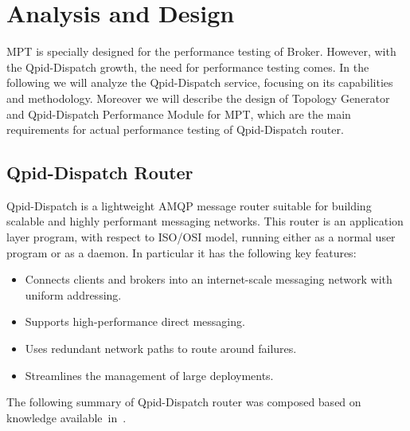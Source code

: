 
\chapter{Analysis and Design}
\label{Analysis and Design}
MPT is specially designed for the performance testing of Broker. However, with the Qpid-Dispatch growth, the need for performance testing comes. In the following we will analyze the Qpid-Dispatch service, focusing on its capabilities and methodology. Moreover we will describe the design of Topology Generator and Qpid-Dispatch Performance Module for MPT, which are the main requirements for actual performance testing of Qpid-Dispatch router.

\section{Qpid-Dispatch Router}
Qpid-Dispatch is a lightweight AMQP message router suitable for building scalable and highly performant messaging networks. This router is an application layer program, with respect to ISO/OSI\footnotemark{} model, running either as a normal user program or as a daemon. In particular it has the following key features:

\begin{itemize}
	\setlength\itemsep{0em}
	\item Connects clients and brokers into an internet-scale messaging network with uniform addressing.
	\item Supports high-performance direct messaging.
	\item Uses redundant network paths to route around failures.
	\item Streamlines the management of large deployments.
\end{itemize}
The following summary of Qpid-Dispatch router was composed based on knowledge available~in~\cite{RH:Interconnect}.


